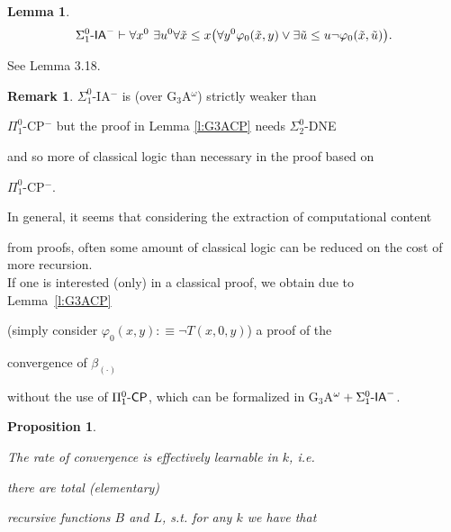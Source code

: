 \documentclass[1p]{elsarticle}
\newcommand{\usftext}[1]{\textsf{\upshape #1}}
\newcommand{\IA}{\ensuremath{\usftext{IA}}} %
\newcommand{\CP}{\ensuremath{\usftext{CP}}}
\newcommand{\PiLm}{\ensuremath{\Pi^0_1\usftext{-}}}
\newcommand{\SiLm}{\ensuremath{\Sigma^0_1\usftext{-}}}
\theoremstyle{plain}
\newtheorem{lemma}[thm]{Lemma}
\newtheorem{prop}[thm]{Proposition}
\theoremstyle{definition}
\newtheorem{rmk}[thm]{Remark}
\theoremstyle{remark}
\renewenvironment{proof}[1][]{\noindent{\bf Proof{#1}. }}{\nopagebreak[4]{\hspace*{\fill}


  $\Box$              %

 }{\vspace{2ex}}}
\renewcommand{\phi}{\varphi}
\theoremstyle{definition}
\begin{document}
{\begin{lemma}
\[\SiLm\IA^- \vdash 

\forall x^0\ \exists u^0 

\forall\tilde x\leq x \big(  

\forall y^0 \phi_0(\tilde x,y)

\vee\exists\tilde u\leq u\neg\phi_0(\tilde x,\tilde u) \big).

\] 

\end{lemma}

\begin{proof}

See \cite{Kohlenbach(book)} Lemma 3.18.

\end{proof}



\begin{rmk}

$\Sigma^0_1$-IA$^-$ is (over G$_3$A$^{\omega}$) strictly weaker than 

$\Pi^0_1$-CP$^-$ but the proof in Lemma \ref{l:G3ACP} needs $\Sigma^0_2$-DNE 

and so more of classical logic than necessary in the proof based on 

$\Pi^0_1$-CP$^-$.

In general, it seems that considering the extraction of computational content 

from proofs, often some amount of classical logic can be reduced on the cost of more recursion.\\

If one is interested (only) in a classical proof, we obtain due to Lemma~\ref{l:G3ACP}

(simply consider $\varphi_0(x,y):\equiv \neg T(x,0,y)$) a proof of the 

convergence of $\beta_{(\cdot)}$ 

without the use of $\PiLm\CP$, which can be formalized in G$_3$A$^{\omega}+\SiLm\IA^-$.

\end{rmk}





\begin{prop}\label{p:alphaIsLearnable}

The rate of convergence is effectively learnable in $k$, i.e.

there are total (elementary) 

recursive functions $B$ and $L$, s.t. for any $k$ we have that


\end{prop}}
\end{document}
